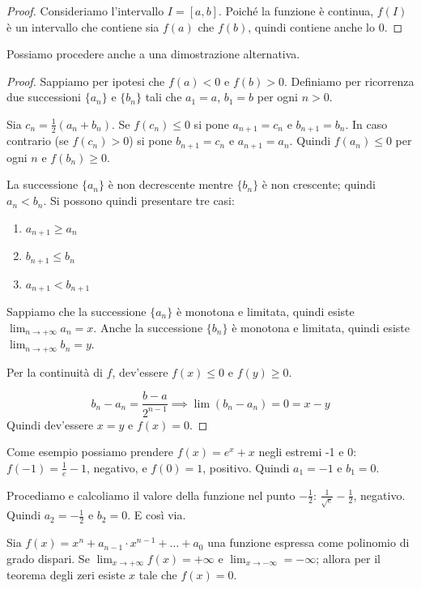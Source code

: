 \begin{proof}
Consideriamo l'intervallo $I = [a, b]$. Poiché la funzione è continua, $f(I)$ è un intervallo che contiene sia $f(a)$ che $f(b)$, quindi contiene anche lo 0.
\end{proof}

Possiamo procedere anche a una dimostrazione alternativa.

\begin{proof}
Sappiamo per ipotesi che $f(a) < 0$ e $f(b) > 0$. Definiamo per ricorrenza due successioni $\{a_n\}$ e $\{b_n\}$ tali che $a_1 = a$, $b_1 = b$ per ogni $n > 0$.

Sia $c_n = \frac{1}{2} (a_n + b_n)$. Se $f(c_n) \le 0$ si pone $a_{n+1} = c_n$ e $b_{n+1} = b_n$. In caso contrario (se $f(c_n) > 0$) si pone $b_{n+1} = c_n$ e $a_{n+1} = a_n$. Quindi $f(a_n) \le 0$ per ogni $n$ e $f(b_n) \ge 0$.

La successione $\{a_n\}$ è non decrescente mentre $\{b_n\}$ è non crescente; quindi $a_n < b_n$. Si possono quindi presentare tre casi:
\begin{enumerate}
\item $a_{n+1} \ge a_n$
\item $b_{n+1} \le b_n$
\item $a_{n+1} < b_{n+1}$
\end{enumerate}
Sappiamo che la successione $\{a_n\}$ è monotona e limitata, quindi esiste $\lim_{n \to +\infty} a_n = x$. Anche la successione $\{b_n\}$ è monotona e limitata, quindi esiste $\lim_{n \to +\infty} b_n = y$.

Per la continuità di $f$, dev'essere $f(x) \le 0$ e $f(y) \ge 0$.

\begin{equation*}
b_n - a_n = \frac{b-a}{2^{n-1}} \implies \lim (b_n - a_n) = 0 = x - y
\end{equation*}
Quindi dev'essere $x = y$ e $f(x) = 0$.
\end{proof}

Come esempio possiamo prendere $f(x) = e^x + x$ negli estremi -1 e 0: $f(-1) = \frac{1}{e} - 1$, negativo, e $f(0)=1$, positivo. Quindi $a_1 = -1$ e $b_1 = 0$. 

Procediamo e calcoliamo il valore della funzione nel punto $-\frac{1}{2}$: $\frac{1}{\sqrt{e}} - \frac{1}{2}$, negativo. Quindi $a_2 = -\frac{1}{2}$ e $b_2 = 0$. E così via.

\begin{example}
Sia $f(x) = x^n + a_{n-1} \cdot x^{n-1} + \ldots + a_0$ una funzione espressa come polinomio di grado dispari. Se $\lim_{x \to +\infty} f(x) = +\infty$ e $\lim_{x \to -\infty} = -\infty$; allora per il teorema degli zeri esiste $x$ tale che $f(x) = 0$.
\end{example}

